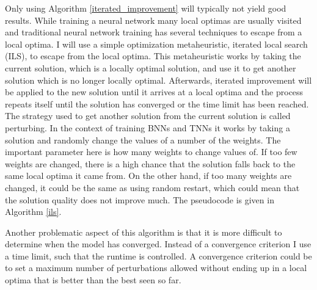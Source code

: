 \noindent Only using Algorithm \ref{iterated_improvement} will typically not yield good results. While training a neural network many local optimas are usually visited and traditional neural network training has several techniques to escape from a local optima. I will use a simple optimization metaheuristic, iterated local search (ILS), to escape from the local optima. This metaheuristic works by taking the current solution, which is a locally optimal solution, and use it to get another solution which is no longer locally optimal. Afterwards, iterated improvement will be applied to the new solution until it arrives at a local optima and the process repeats itself until the solution has converged or the time limit has been reached. The strategy used to get another solution from the current solution is called perturbing. In the context of training BNNs and TNNs it works by taking a solution and randomly change the values of a number of the weights. The important parameter here is how many weights to change values of. If too few weights are changed, there is a high chance that the solution falls back to the same local optima it came from. On the other hand, if too many weights are changed, it could be the same as using random restart, which could mean that the solution quality does not improve much. The pseudocode is given in Algorithm \ref{ils}. 

\noindent Another problematic aspect of this algorithm is that it is more difficult to determine when the model has converged. Instead of a convergence criterion I use a time limit, such that the runtime is controlled. A convergence criterion could be to set a maximum number of perturbations allowed without ending up in a local optima that is better than the best seen so far. 

